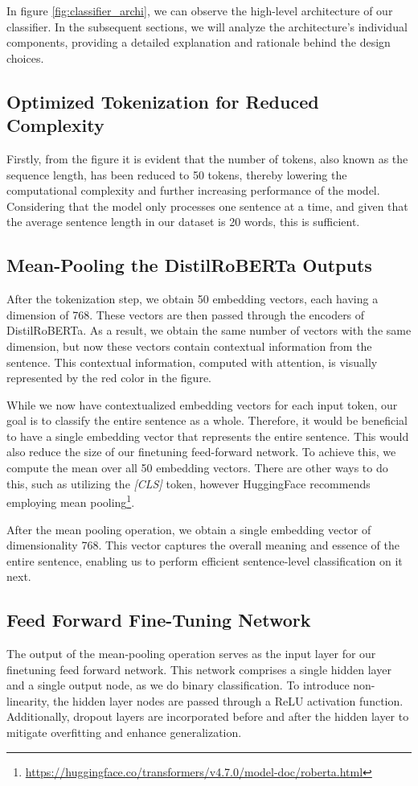 \documentclass[12pt,oneside,bibtotoc,liststotoc]{scrbook}
\begin{document}
In figure \ref{fig:classifier_archi}, we can observe the high-level architecture of our classifier. In the subsequent sections, we will analyze the architecture's individual components, providing a detailed explanation and rationale behind the design choices.

\subsection{Optimized Tokenization for Reduced Complexity}
Firstly, from the figure it is evident that the number of tokens, also known as the sequence length, has been reduced to 50 tokens, thereby lowering the computational complexity and further increasing performance of the model. Considering that the model only processes one sentence at a time, and given that the average sentence length in our dataset is 20 words, this is sufficient.

\subsection{Mean-Pooling the DistilRoBERTa Outputs}
After the tokenization step, we obtain 50 embedding vectors, each having a dimension of 768. These vectors are then passed through the encoders of DistilRoBERTa. As a result, we obtain the same number of vectors with the same dimension, but now these vectors contain contextual information from the sentence. This contextual information, computed with attention, is visually represented by the red color in the figure.

While we now have contextualized embedding vectors for each input token, our goal is to classify the entire sentence as a whole. Therefore, it would be beneficial to have a single embedding vector that represents the entire sentence. This would also reduce the size of our finetuning feed-forward network. To achieve this, we compute the mean over all 50 embedding vectors. There are other ways to do this, such as utilizing the \textit{[CLS]} token, however HuggingFace recommends employing mean pooling\footnote{\url{https://huggingface.co/transformers/v4.7.0/model-doc/roberta.html}}.

After the mean pooling operation, we obtain a single embedding vector of dimensionality 768. This vector captures the overall meaning and essence of the entire sentence, enabling us to perform efficient sentence-level classification on it next.

\subsection{Feed Forward Fine-Tuning Network}
The output of the mean-pooling operation serves as the input layer for our finetuning feed forward network. This network comprises a single hidden layer and a single output node, as we do binary classification. To introduce non-linearity, the hidden layer nodes are passed through a ReLU activation function. Additionally, dropout layers are incorporated before and after the hidden layer to mitigate overfitting and enhance generalization.
\end{document}
